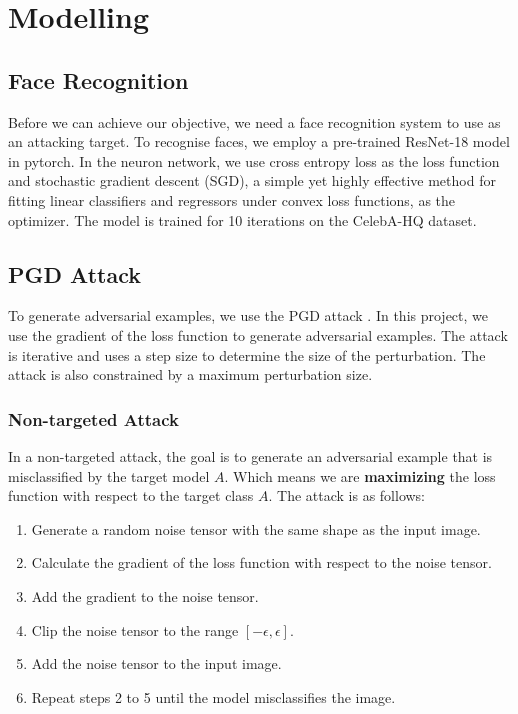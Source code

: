 \section{Modelling}

\subsection{Face Recognition}

Before we can achieve our objective, we need a face recognition system to use as an attacking target. To recognise faces, we employ a pre-trained ResNet-18 model in pytorch.
In the neuron network, we use cross entropy loss as the loss function and stochastic gradient descent (SGD), a simple yet highly effective method for fitting linear classifiers and regressors under convex loss functions, as the optimizer. The model is trained for 10 iterations on the CelebA-HQ dataset.

\subsection{PGD Attack}

To generate adversarial examples, we use the PGD attack \cite{madry2017towards}. In this project, we use the gradient of the loss function to generate adversarial examples. The attack is iterative and uses a step size to determine the size of the perturbation. The attack is also constrained by a maximum perturbation size.

\subsubsection{Non-targeted Attack}

In a non-targeted attack, the goal is to generate an adversarial example that is misclassified by the target model $A$. Which means we are \textbf{maximizing} the loss function with respect to the target class $A$. The attack is as follows:

\begin{enumerate}
    \item Generate a random noise tensor with the same shape as the input image.
    \item Calculate the gradient of the loss function with respect to the noise tensor.
    \item Add the gradient to the noise tensor.
    \item Clip the noise tensor to the range $[-\epsilon, \epsilon]$.
    \item Add the noise tensor to the input image.
    \item Repeat steps 2 to 5 until the model misclassifies the image.
\end{enumerate}

